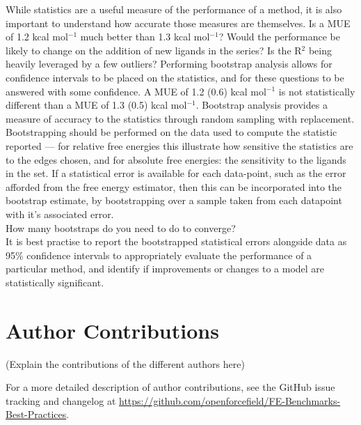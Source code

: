 \documentclass[9pt,bestpractices]{livecoms}
\newcommand{\githubrepository}{\url{https://github.com/openforcefield/FE-Benchmarks-Best-Practices}}  %
\begin{document}
While statistics are a useful measure of the performance of a method, it is also important to understand how accurate those measures are themselves. Is a MUE of 1.2 kcal mol$^{-1}$ much better than 1.3 kcal mol$^{-1}$? Would the performance be likely to change on the addition of new ligands in the series? Is the R$^2$ being heavily leveraged by a few outliers? Performing bootstrap analysis allows for confidence intervals to be placed on the statistics, and for these questions to be answered with some confidence. A MUE of 1.2 (0.6) kcal mol$^{-1}$ is not statistically different than a MUE of 1.3 (0.5) kcal mol$^{-1}$. Bootstrap analysis provides a measure of accuracy to the statistics through random sampling with replacement. Bootstrapping should be performed on the data used to compute the statistic reported --- for relative free energies this illustrate how sensitive the statistics are to the edges chosen, and for absolute free energies: the sensitivity to the ligands in the set. If a statistical error is available for each data-point, such as the error afforded from the free energy estimator, then this can be incorporated into the bootstrap estimate, by bootstrapping over a sample taken from each datapoint with it's associated error.\\
How many bootstraps do you need to do to converge?\\
It is best practise to report the bootstrapped statistical errors alongside data as 95\% confidence intervals to appropriately evaluate the performance of a particular method, and identify if improvements or changes to a model are statistically significant.


\section{Author Contributions}
%

(Explain the contributions of the different authors here)

For a more detailed description of author contributions,
see the GitHub issue tracking and changelog at \githubrepository.
\end{document}
